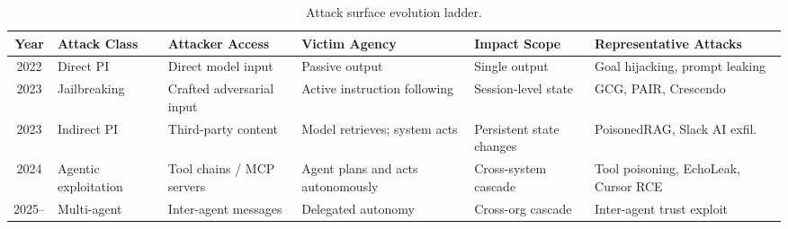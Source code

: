 
\begin{table}[htbp]
\centering
\caption{Attack surface evolution ladder.}
\label{tab:ladder}

\fontsize{7}{7}\selectfont
\setlength{\tabcolsep}{5pt}
\renewcommand{\arraystretch}{1.3}

\begin{tabularx}{\textwidth}{
  c
  >{\raggedright\arraybackslash}p{2.0cm}
  >{\raggedright\arraybackslash}X
  >{\raggedright\arraybackslash}X
  >{\raggedright\arraybackslash}X
  >{\raggedright\arraybackslash}p{3.2cm}
}
\toprule
\textbf{Year} & \textbf{Attack Class} & \textbf{Attacker Access} & \textbf{Victim Agency} & \textbf{Impact Scope} & \textbf{Representative Attacks} \\
\midrule

\rowcolor{rowgray}
2022 & Direct PI
  & Direct model input
  & Passive output
  & Single output
  & Goal hijacking, prompt leaking \\

\addlinespace[2pt]

2023 & Jailbreaking
  & Crafted adversarial input
  & Active instruction following
  & Session-level state
  & GCG, PAIR, Crescendo \\

\addlinespace[2pt]

\rowcolor{rowgray}
2023 & Indirect PI
  & Third-party content
  & Model retrieves; system acts
  & Persistent state changes
  & PoisonedRAG, Slack AI exfil. \\

\addlinespace[2pt]

2024 & Agentic exploitation
  & Tool chains / MCP servers
  & Agent plans and acts autonomously
  & Cross-system cascade
  & Tool poisoning, EchoLeak, Cursor RCE \\

\addlinespace[2pt]

\rowcolor{rowgray}
2025-- & Multi-agent
  & Inter-agent messages
  & Delegated autonomy
  & Cross-org cascade
  & Inter-agent trust exploit \\

\bottomrule
\end{tabularx}
\end{table}
